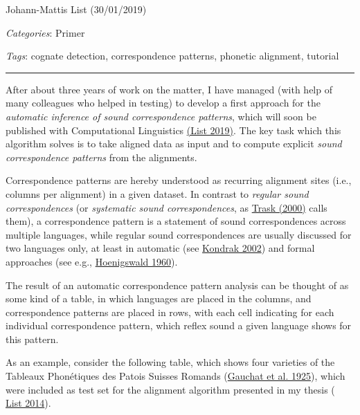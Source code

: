 \documentclass[
  a4paper,
  14pt,
  oneside,
  tablecaptionabove
]{scrbook}
\begin{document}
Johann-Mattis List (30/01/2019)

\emph{Categories}: Primer

\emph{Tags}: cognate detection, correspondence patterns, phonetic
alignment, tutorial

\begin{center}\rule{0.5\linewidth}{1pt}\end{center}

After about three years of work on the matter, I have managed (with help
of many colleagues who helped in testing) to develop a first approach
for the \emph{automatic inference of sound correspondence patterns},
which will soon be published with Computational Linguistics
\href{http://bibliography.lingpy.org?key=List2019a}{(List 2019)}. The
key task which this algorithm solves is to take aligned data as input
and to compute explicit \emph{sound correspondence patterns} from the
alignments.

Correspondence patterns are hereby understood as recurring alignment
sites (i.e., columns per alignment) in a given dataset. In contrast to
\emph{regular sound correspondences} (or \emph{systematic sound
correspondences}, as
\href{http://bibliography.lingpy.org?key=Trask2000}{Trask (2000)} calls
them), a correspondence pattern is a statement of sound correspondences
across multiple languages, while regular sound correspondences are
usually discussed for two languages only, at least in automatic (see
\href{http://bibliography.lingpy.org?key=Kondrak2002a}{Kondrak 2002})
and formal approaches (see e.g.,
\href{http://bibliography.lingpy.org?key=Hoenigswald1960}{Hoenigswald
1960}).

The result of an automatic correspondence pattern analysis can be
thought of as some kind of a table, in which languages are placed in the
columns, and correspondence patterns are placed in rows, with each cell
indicating for each individual correspondence pattern, which reflex
sound a given language shows for this pattern.

As an example, consider the following table, which shows four varieties
of the Tableaux Phonétiques des Patois Suisses Romands (\href{http://bibliography.lingpy.org?key=Gauchat1925}{Gauchat et al.
1925}), which were included as test set for the alignment algorithm
presented in my thesis (
\href{http://bibliography.lingpy.org?key=List2014d}{List 2014}).
\end{document}
